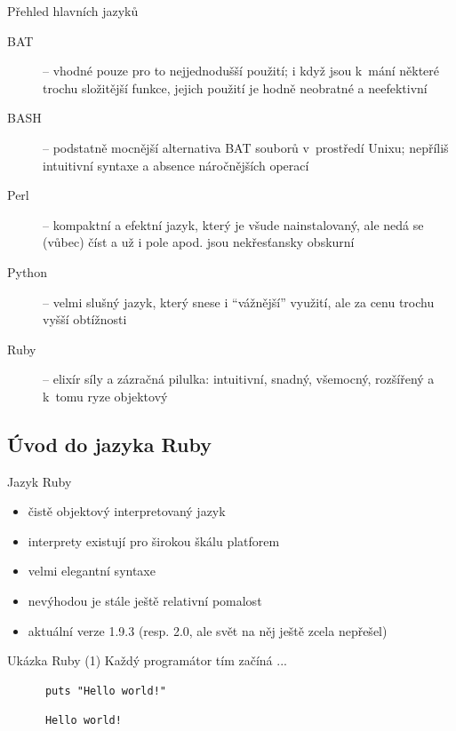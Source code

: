\documentclass{beamer}
\begin{document}
\begin{frame}{Přehled hlavních jazyků}
  \begin{description}
    \item[BAT] -- vhodné pouze pro to nejjednodušší použití; i když jsou k~mání některé trochu složitější funkce, jejich použití je hodně neobratné a neefektivní
    \item[BASH] -- podstatně mocnější alternativa BAT souborů v~prostředí Unixu; nepříliš intuitivní syntaxe a absence náročnějších operací
    \item[Perl] -- kompaktní a efektní jazyk, který je všude nainstalovaný, ale nedá se (vůbec) číst a už i pole apod. jsou nekřesťansky obskurní
    \item[Python] -- velmi slušný jazyk, který snese i ``vážnější'' využití, ale za cenu trochu vyšší obtížnosti
    \item[Ruby] -- elixír síly a zázračná pilulka: intuitivní, snadný, všemocný, rozšířený a k~tomu ryze objektový
  \end{description}
\end{frame}

\subsection{Úvod do jazyka Ruby}

\begin{frame}{Jazyk Ruby}
  \begin{itemize}
    \item čistě objektový interpretovaný jazyk
    \item interprety existují pro širokou škálu platforem
    \item velmi elegantní syntaxe
    \item nevýhodou je stále ještě relativní pomalost
    \item aktuální verze 1.9.3 (resp. 2.0, ale svět na něj ještě zcela nepřešel)
  \end{itemize}
\end{frame}

\begin{frame}[fragile]{Ukázka Ruby (1)}
  Každý programátor tím začíná ...
  \begin{block}{}
    \smallskip \footnotesize
    {\scriptsize \begin{verbatim}
      puts "Hello world!"
    \end{verbatim}}
  \end{block}
  \pause
  \begin{block}{}
    \smallskip \footnotesize
    {\scriptsize \begin{verbatim}
      Hello world!
    \end{verbatim}}
  \end{block}
\end{frame}
\end{document}
